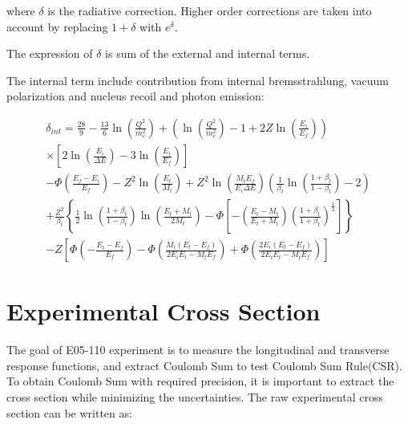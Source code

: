 where $\delta$ is the radiative correction. Higher order corrections are taken into account by replacing
$1+\delta$ with $e^{\delta}$.

The expression of $\delta$ is sum of the external and internal terms.

The internal term include contribution from internal bremsstrahlung, vacuum polarization and nucleus recoil and photon emission: 

\begin{multline}
\delta_{int}  =
\frac{28}{9} - \frac{13}{6} \ln \left( \frac{Q^2}{m^2_e} \right)  +
\left( \ln \left( \frac{Q^2}{m^2_e} \right) - 1 + 2Z \ln \left( \frac{E_i}{E_f} \right) \right) \\
\times \left[ 2\ln \left( \frac{E_i}{\Delta E} \right) - 3\ln \left( \frac{E_i}{E_f} \right) \right]  \\
-\Phi \left( \frac{E_f-E_i}{E_f} \right)
- Z^2 \ln \left( \frac{E_t}{M_t} \right)
+ Z^2 \ln \left( \frac{M_t E_f}{E_i \Delta E} \right)
\left( \frac{1}{\beta_t} \ln \left( \frac{1+\beta_t}{1-\beta_t} \right) -2 \right) \\
+ \frac{Z^2}{\beta_t} \left\{ \frac{1}{2} \ln\left( \frac{1+\beta_t}{1-\beta_t} \right) \ln\left( \frac{E_t+M_t}{2M_t} \right) 
-\Phi \left[ -\left( \frac{E_t-M_t}{E_t+M_t}\right) \left(  \frac{1+\beta_t}{1+\beta_t} \right)^{\frac{1}{2}} \right]
\right\} \\
- Z \left[ \Phi\left(-\frac{E_t-E_f}{E_f}\right) -\Phi\left( \frac{M_t(E_t-E_f)}{2E_iE_t-M_tE_f} \right)
+ \Phi \left( \frac{2E_i(E_t - E_f)}{2E_i E_t - M_t E_f} \right)  
\right]
\end{multline}


\section{Experimental Cross Section}
The goal of E05-110 experiment is to measure the longitudinal and transverse response functions, and 
extract Coulomb Sum to test Coulomb Sum Rule(CSR). To obtain Coulomb Sum with required precision,
it is important to extract the cross section while minimizing the uncertainties. The raw experimental cross
section can be written as:


